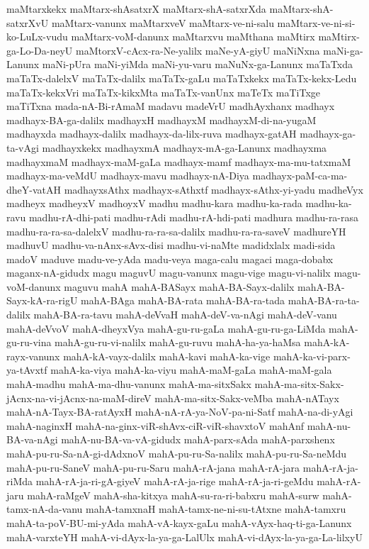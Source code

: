 {maMtarxkekx
maMtarx-shAsatxrX
maMtarx-shA-satxrXda
maMtarx-shA-satxrXvU
maMtarx-vanunx
maMtarxveV
maMtarx-ve-ni-salu
maMtarx-ve-ni-si-ko-LuLx-vudu
maMtarx-voM-danunx
maMtarxvu
maMthana
maMtirx
maMtirx-ga-Lo-Da-neyU
maMtorxV-cAcx-ra-Ne-yalilx
maNe-yA-giyU
maNiNxna
maNi-ga-Lanunx
maNi-pUra
maNi-yiMda
maNi-yu-varu
maNuNx-ga-Lanunx
maTaTxda
maTaTx-dalelxV
maTaTx-dalilx
maTaTx-gaLu
maTaTxkekx
maTaTx-kekx-Ledu
maTaTx-kekxVri
maTaTx-kikxMta
maTaTx-vanUnx
maTeTx
maTiTxge
maTiTxna
mada-nA-Bi-rAmaM
madavu
madeVrU
madhAyxhanx
madhayx
madhayx-BA-ga-dalilx
madhayxH
madhayxM
madhayxM-di-na-yugaM
madhayxda
madhayx-dalilx
madhayx-da-lilx-ruva
madhayx-gatAH
madhayx-ga-ta-vAgi
madhayxkekx
madhayxmA
madhayx-mA-ga-Lanunx
madhayxma
madhayxmaM
madhayx-maM-gaLa
madhayx-mamf
madhayx-ma-mu-tatxmaM
madhayx-ma-veMdU
madhayx-mavu
madhayx-nA-Diya
madhayx-paM-ca-ma-dheY-vatAH
madhayxsAthx
madhayx-sAthxtf
madhayx-sAthx-yi-yadu
madheVyx
madheyx
madheyxV
madhoyxV
madhu
madhu-kara
madhu-ka-rada
madhu-ka-ravu
madhu-rA-dhi-pati
madhu-rAdi
madhu-rA-hdi-pati
madhura
madhu-ra-rasa
madhu-ra-ra-sa-dalelxV
madhu-ra-ra-sa-dalilx
madhu-ra-ra-saveV
madhureYH
madhuvU
madhu-va-nAnx-sAvx-disi
madhu-vi-naMte
madidxlalx
madi-sida
madoV
maduve
madu-ve-yAda
madu-veya
maga-calu
magaci
maga-dobabx
maganx-nA-gidudx
magu
maguvU
magu-vanunx
magu-vige
magu-vi-nalilx
magu-voM-danunx
maguvu
mahA
mahA-BASayx
mahA-BA-Sayx-dalilx
mahA-BA-Sayx-kA-ra-rigU
mahA-BAga
mahA-BA-rata
mahA-BA-ra-tada
mahA-BA-ra-ta-dalilx
mahA-BA-ra-tavu
mahA-deVvaH
mahA-deV-va-nAgi
mahA-deV-vanu
mahA-deVvoV
mahA-dheyxVya
mahA-gu-ru-gaLa
mahA-gu-ru-ga-LiMda
mahA-gu-ru-vina
mahA-gu-ru-vi-nalilx
mahA-gu-ruvu
mahA-ha-ya-haMsa
mahA-kA-rayx-vanunx
mahA-kA-vayx-dalilx
mahA-kavi
mahA-ka-vige
mahA-ka-vi-parx-ya-tAvxtf
mahA-ka-viya
mahA-ka-viyu
mahA-maM-gaLa
mahA-maM-gala
mahA-madhu
mahA-ma-dhu-vanunx
mahA-ma-sitxSakx
mahA-ma-sitx-Sakx-jAcnx-na-vi-jAcnx-na-maM-direV
mahA-ma-sitx-Sakx-veMba
mahA-nATayx
mahA-nA-Tayx-BA-ratAyxH
mahA-nA-rA-ya-NoV-pa-ni-Satf
mahA-na-di-yAgi
mahA-naginxH
mahA-na-ginx-viR-shAvx-ciR-viR-shavxtoV
mahAnf
mahA-nu-BA-va-nAgi
mahA-nu-BA-va-vA-gidudx
mahA-parx-sAda
mahA-parxshenx
mahA-pu-ru-Sa-nA-gi-dAdxnoV
mahA-pu-ru-Sa-nalilx
mahA-pu-ru-Sa-neMdu
mahA-pu-ru-SaneV
mahA-pu-ru-Saru
mahA-rA-jana
mahA-rA-jara
mahA-rA-ja-riMda
mahA-rA-ja-ri-gA-giyeV
mahA-rA-ja-rige
mahA-rA-ja-ri-geMdu
mahA-rA-jaru
mahA-raMgeV
mahA-sha-kitxya
mahA-su-ra-ri-babxru
mahA-surw
mahA-tamx-nA-da-vanu
mahA-tamxnaH
mahA-tamx-ne-ni-su-tAtxne
mahA-tamxru
mahA-ta-poV-BU-mi-yAda
mahA-vA-kayx-gaLu
mahA-vAyx-haq-ti-ga-Lanunx
mahA-varxteYH
mahA-vi-dAyx-la-ya-ga-LalUlx
mahA-vi-dAyx-la-ya-ga-La-lilxyU
}
